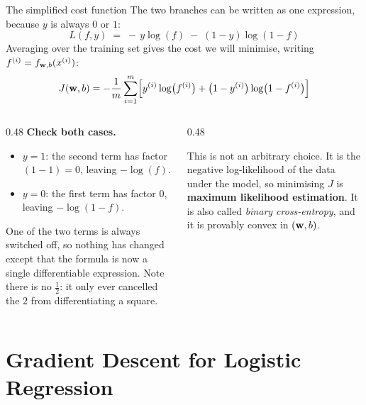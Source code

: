 \documentclass[aspectratio=169,10pt]{beamer}
\begin{document}
\begin{frame}{The simplified cost function}
  \small
  The two branches can be written as one expression, because $y$ is always $0$ or $1$:
  \[
    \boxed{\;L(f,y) \;=\; -\,y\log(f) \;-\; (1-y)\log(1-f)\;}
  \]
  \footnotesize
  Averaging over the training set gives the cost we will minimise, writing
  $f^{(i)}=f_{\mathbf{w},b}(x^{(i)})$:
  \[
    J(\mathbf{w},b) = -\frac{1}{m}\sum_{i=1}^{m}
      \Bigl[ y^{(i)}\log\bigl(f^{(i)}\bigr) + \bigl(1-y^{(i)}\bigr)\log\bigl(1-f^{(i)}\bigr) \Bigr]
  \]
  \begin{columns}[T,onlytextwidth]
    \begin{column}{0.48\textwidth}
      \textbf{Check both cases.}
      \begin{itemize}
        \item $y=1$: the second term has factor $(1-1)=0$, leaving $-\log(f)$.
        \item $y=0$: the first term has factor $0$, leaving $-\log(1-f)$.
      \end{itemize}
      One of the two terms is always switched off, so nothing has changed except that the
      formula is now a single differentiable expression. Note there is no $\tfrac12$: it only
      ever cancelled the $2$ from differentiating a square.
    \end{column}
    \begin{column}{0.48\textwidth}
      \begin{keyidea}
        \footnotesize
        This is not an arbitrary choice. It is the negative log-likelihood of the data under
        the model, so minimising $J$ is \textbf{maximum likelihood estimation}. It is also
        called \emph{binary cross-entropy}, and it is provably convex in $(\mathbf{w},b)$.
      \end{keyidea}
    \end{column}
  \end{columns}
\end{frame}

\section{Gradient Descent for Logistic Regression}
\end{document}
